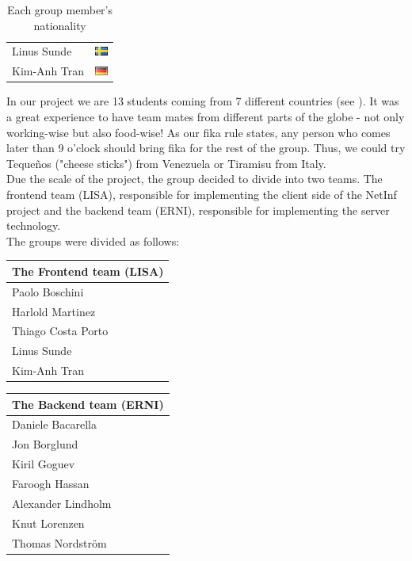 \begin{table}
\begin{tabular}{|l|c|}
Linus Sunde & \includegraphics{graphics/se.png} \\
Kim-Anh Tran & \includegraphics{graphics/de.png} \\
\hline
\end{tabular}
\caption{Each group member's nationality}\label{tab:nationality}
\end{table}

In our project we are 13 students coming from 7 different countries (see ).
It was a great experience to have team mates from different parts of the globe - not
only working-wise but also food-wise! As our fika rule states, any person who comes later
than 9 o'clock should bring fika for the rest of the group. Thus, we could
try Teque\~{n}os ("cheese sticks") from Venezuela or Tiramisu from Italy.\\

Due the scale of the project, the group decided to divide into two teams. 
The frontend team (LISA), responsible for implementing the client side of the NetInf project and the backend team (ERNI), responsible for implementing the server technology.\\

The groups were divided as follows:

\begin{minipage}[b]{0.32\hsize}\centering
\begin{tabular}{l}
The Frontend team (LISA) \\\hline
Paolo Boschini\\
Harlold Martinez\\
Thiago Costa Porto\\
Linus Sunde\\
Kim-Anh Tran
\end{tabular}
\end{minipage}
\hfill
\begin{minipage}[b]{0.32\hsize}\centering
\begin{tabular}{l}
The Backend team (ERNI) \\\hline
Daniele Bacarella\\
Jon Borglund\\
Kiril Goguev\\
Faroogh Hassan\\
Alexander Lindholm\\
Knut Lorenzen\\
Thomas Nordstr\"om
\end{tabular}
\end{minipage}

